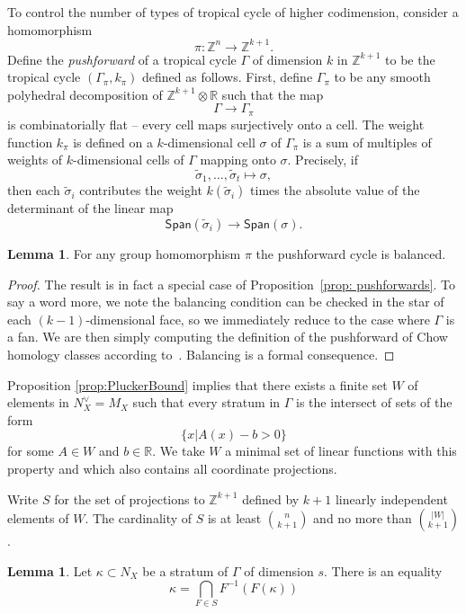 \documentclass[11pt]{amsart}
\theoremstyle{definition}
\theoremstyle{definition}
\newtheorem{lemma}[theorem]{Lemma}
\begin{document}
To control the number of types of tropical cycle of higher codimension, consider a homomorphism $$\pi\colon \mathbb{Z}^n\rightarrow\mathbb{Z}^{k+1}.$$ Define the \textit{pushforward} of a tropical cycle $\Gamma$ of dimension $k$ in $\mathbb{Z}^{k+1}$ to be the tropical cycle $(\Gamma_\pi,k_\pi)$ defined as follows. First, define $\Gamma_\pi$  to be any smooth polyhedral decomposition of $\mathbb Z^{k+1}\otimes\mathbb R$ such that the map
\[
\Gamma\to\Gamma_\pi
\]
is combinatorially flat -- every cell maps surjectively onto a cell. The weight function $k_\pi$ is defined on a $k$-dimensional cell $\sigma$ of $\Gamma_\pi$ is a sum of multiples of weights of $k$-dimensional cells of $\Gamma$ mapping onto $\sigma$. Precisely, if 
\[
\widetilde \sigma_1,\ldots,\widetilde\sigma_t\mapsto \sigma,
\]
then each $\widetilde\sigma_i$ contributes  the weight $k(\widetilde \sigma_i)$ times the absolute value of the determinant of the linear map
\[
\mathsf{Span}(\widetilde \sigma_i)\to\mathsf{Span}(\sigma).
\]

\begin{lemma}
    For any group homomorphism $\pi$ the pushforward cycle is balanced.
\end{lemma}
\begin{proof}
The result is in fact a special case of Proposition~\ref{prop: pushforwards}. To say a word more, we note the balancing condition can be checked in the star of each $(k-1)$-dimensional face, so we immediately reduce to the case where $\Gamma$ is a fan. We are then simply computing the definition of the pushforward of Chow homology classes according to~\cite{IntToricVar}. Balancing is a formal consequence. 
\end{proof}

Proposition \ref{prop:PluckerBound} implies that there exists a finite set $W$ of elements in $N_X^\vee = M_X$ such that every stratum in $\Gamma$ is the intersect of sets of the form $$\{x|A(x)-b>0\}$$ for some $A\in W$ and $b\in \mathbb{R}$. We take $W$ a minimal set of linear functions with this property and which also contains all coordinate projections.

Write $S$ for the set of projections to $\mathbb{Z}^{k+1}$ defined by $k+1$ linearly independent elements of $W$. The cardinality of $S$ is at least $\binom{n}{k+1}$ and no more than $\binom{|W|}{k+1}$. 

\begin{lemma}\label{lemma:DeterminedByProjections}
    Let ${\kappa} \subset N_X$ be a stratum of $\Gamma$ of dimension $s$. There is an equality $${\kappa}=\bigcap_{F\in S} F^{-1}(F(\kappa))$$ 
\end{lemma}
\end{document}
